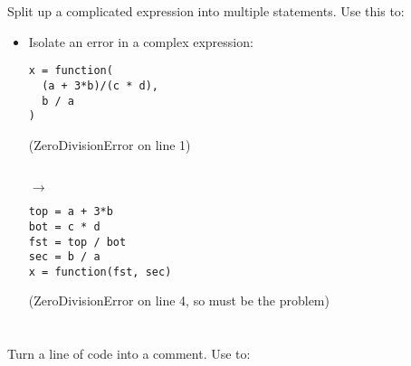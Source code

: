 \documentclass{poster}
\begin{document}
\newpage

\section{}

Split up a complicated expression into multiple statements. Use this to:

\begin{itemize}

\item Isolate an error in a complex expression: \\
\noindent
\begin{minipage}[t]{0.45\columnwidth}
\begin{lstlisting}
x = function(
  (a + 3*b)/(c * d),
  b / a
)
\end{lstlisting}
(ZeroDivisionError on line 1)
\end{minipage}
\begin{minipage}[t]{0.05\columnwidth}
\  \\
\hspace*{1ex}$\rightarrow$
\end{minipage}
\begin{minipage}[t]{0.45\columnwidth}
\begin{lstlisting}
top = a + 3*b
bot = c * d
fst = top / bot
sec = b / a
x = function(fst, sec)
\end{lstlisting}
(ZeroDivisionError on line 4, so  must be the problem)
\end{minipage}

\end{itemize}


\section{}

Turn a line of code into a comment. Use to:
\end{document}
